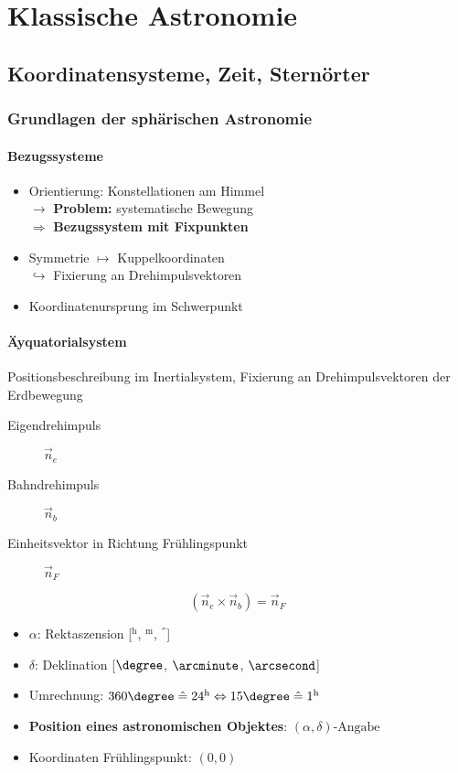 \part{Klassische Astronomie}
\chapter{Koordinatensysteme, Zeit, Sternörter}
\section{Grundlagen der sphärischen Astronomie}
\subsection{Bezugssysteme}
\begin{itemize}
    \item Orientierung: Konstellationen am Himmel\\
        $\rightarrow$ \textbf{Problem:} systematische Bewegung\\
        $\Rightarrow$ \textbf{Bezugssystem mit Fixpunkten}
    \item Symmetrie $\mapsto$ Kuppelkoordinaten \\
        $\hookrightarrow$ Fixierung an Drehimpulsvektoren
    \item Koordinatenursprung im Schwerpunkt
\end{itemize}

\subsection{Äyquatorialsystem}
\begin{goal}
    Positionsbeschreibung im Inertialsystem, Fixierung an Drehimpulsvektoren
    der Erdbewegung
\end{goal}

\begin{description}
    \item[Eigendrehimpuls]  $\vec n_e$
    \item[Bahndrehimpuls]   $\vec n_b$
    \item[Einheitsvektor in Richtung Frühlingspunkt]   $\vec n_F$
\end{description}

\begin{equation}
    (\vec n_e \times \vec n_b) = \vec n_F
\end{equation}


\begin{itemize}
    \item $\alpha$: Rektaszension [$^\mathrm{h}$, $^\mathrm{m}$, $^\second$]
    \item $\delta$: Deklination [$\degree$, $\arcminute$, $\arcsecond$]
    \item Umrechnung: $360\degree \mathrel{\hat=} 24^\mathrm{h} \Leftrightarrow 15\degree \mathrel{\hat=} 1^\mathrm{h}$
    \item \textbf{Position eines astronomischen Objektes}: $\boxed{(\alpha, \delta)\text{-Angabe}}$
    \item Koordinaten Frühlingspunkt: $(0, 0)$
\end{itemize}
